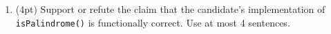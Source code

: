 \documentclass{report}
\newif\ifkey
\newcommand{\answerlong}[1]{\ifkey\color{red}\textbf{#1}\color{black}\else\vspace{0.5in}\fi\xspace}
\newcommand*{\pts}[1]{\addtocounter{points}{#1}(#1pt)}
\begin{document}
\begin{spacing}{1.4}
\begin{enumerate}[leftmargin=*]
\item \pts{4} \label{lastQuestion} Support or refute the claim that the candidate's implementation of \lstinline{isPalindrome()} is functionally correct. Use
  at most 4 sentences.\\
  \answerlong{Refute. The candidate's implementation of isPalindrome() is not functionally correct. The candidate missed a base
case regarding x being a negative number. Negative integers would not count as a palindrome. {-313} reversed is {313-}.}
    


    


\end{enumerate}
\end{spacing}
\end{document}
